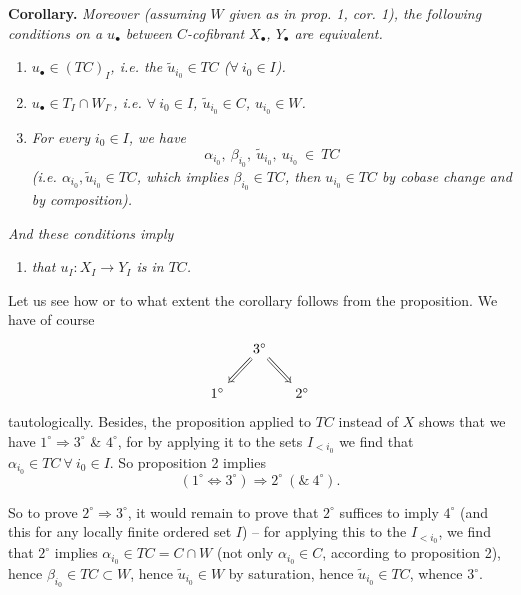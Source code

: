\textbf{Corollary.} \textit{Moreover (assuming $W$ given as in prop. 1, cor. 1), the following conditions on a $u_{\bullet}$ between $C$-cofibrant $X_{\bullet}$, $Y_{\bullet}$ are equivalent.}
\begin{enumerate}
\item[$1^{\circ}$)] \textit{$u_{\bullet} \in (TC)_I$, i.e. the $\tilde{u}_{i_0} \in TC$ ($\forall\ i_0 \in I$).}
\item[$2^{\circ}$)] \textit{$u_{\bullet} \in T_I \cap W_{I^{\circ}}$, i.e. $\forall\ i_0 \in I$, $\tilde{u}_{i_0} \in C$, $u_{i_0} \in W$.} %
\item[$3^{\circ}$)] \textit{For every $i_0 \in I$, we have}
\[
\alpha_{i_0},\ \beta_{i_0},\ \tilde{u}_{i_0},\ u_{i_0} \ \in \ TC
\]
\textit{(i.e. $\alpha_{i_0}, \tilde{u}_{i_0} \in TC$, which implies $\beta_{i_0} \in TC$, then $u_{i_0} \in TC$ by cobase change and by composition).}
\end{enumerate}
\textit{And these conditions imply}
\begin{enumerate}
\item[$4^{\circ}$)] \textit{that $u_I : X_I \longrightarrow Y_I$ is in $TC$.}
\end{enumerate}

Let us see how or to what extent the corollary follows from the proposition. We have of course %
\[
\begin{tikzcd}[column sep=small]
& 3^{\circ} \arrow[dl, Rightarrow] \arrow[dr, Rightarrow] & \\
1^{\circ} & & 2^{\circ}
\end{tikzcd}
\]
tautologically. Besides, the proposition applied to $TC$ instead of $X$ shows that we have $1^{\circ} \Longrightarrow 3^{\circ}$ \& $4^{\circ}$, for by applying it to the sets $I_{<i_0}$ we find that $\alpha_{i_0} \in TC\ \forall\ i_0 \in I$. So proposition 2 implies %
\[
(1^{\circ} \Longleftrightarrow 3^{\circ}) \Longrightarrow 2^{\circ}\ (\&\ 4^{\circ}).
\]


So to prove $2^{\circ} \Longrightarrow 3^{\circ}$, it would remain to prove that $2^{\circ}$ suffices to imply $4^{\circ}$ (and this for any locally finite ordered set $I$) -- for applying this to the $I_{<i_0}$, we find that $2^{\circ}$ implies $\alpha_{i_0} \in TC = C \cap W$ (not only $\alpha_{i_0} \in C$, according to proposition 2), hence $\beta_{i_0} \in TC \subset W$, hence $\tilde{u}_{i_0} \in W$ by saturation, hence $\tilde{u}_{i_0} \in TC$, whence $3^{\circ}$.

